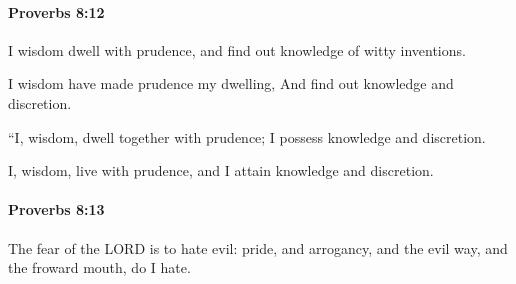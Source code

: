 		\paragraph{Proverbs 8:12} %
			\label{PROVERBS-8-12}

			I wisdom dwell with prudence, and find out knowledge of witty inventions.

			\begin{versebox}
					\item[BHS] 
					\item[ASV] I wisdom have made prudence my dwelling, And find out knowledge and discretion.
					\item[NIV] “I, wisdom, dwell together with prudence; I possess knowledge and discretion.
					\item[NRSV] I, wisdom, live with prudence, and I attain knowledge and discretion.
			\end{versebox}

		\paragraph{Proverbs 8:13} %
			\label{PROVERBS-8-13}

			The fear of the LORD is to hate evil: pride, and arrogancy, and the evil way, and the froward mouth, do I hate.

